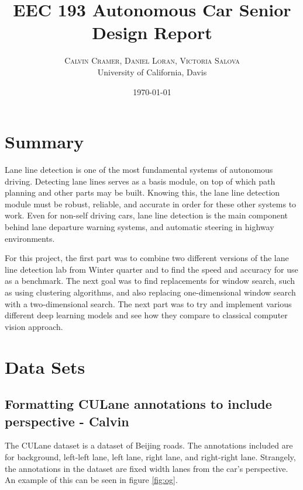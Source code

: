 \documentclass[twoside,twocolumn]{article}
\title{EEC 193 Autonomous Car Senior Design Report} %
\author{%
\textsc{Calvin Cramer, Daniel Loran, Victoria Salova} \\ %
\normalsize University of California, Davis \\ %
}
\date{\today} %
\begin{document}
\maketitle


\section{Summary}

\par Lane line detection is one of the most fundamental systems of autonomous driving. Detecting lane lines serves as a basis module, on top of which path planning and other parts may be built. Knowing this, the lane line detection module must be robust, reliable, and accurate in order for these other systems to work. Even for non-self driving cars, lane line detection is the main component behind lane departure warning systems, and automatic steering in highway environments.
\par For this project, the first part was to combine two different versions of the lane line detection lab from Winter quarter and to find the speed and accuracy for use as a benchmark. The next goal was to find replacements for window search, such as using clustering algorithms, and also replacing one-dimensional window search with a two-dimensional search. The next part was to try and implement various different deep learning models and see how they compare to classical computer vision approach.


\section{Data Sets}
\subsection{Formatting CULane annotations to include perspective - Calvin}
\par The CULane dataset is a dataset of Beijing roads. The annotations included are for background, left-left lane, left lane, right lane, and right-right lane. Strangely, the annotations in the dataset are fixed width lanes from the car's perspective. An example of this can be seen in figure \ref{fig:og}.
\end{document}
